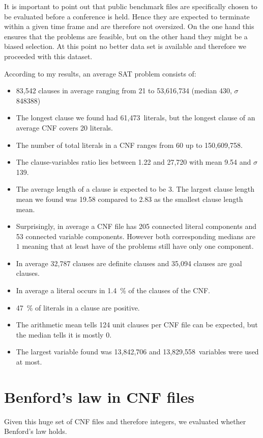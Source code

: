 It is important to point out that public benchmark files are specifically chosen
to be evaluated before a conference is held. Hence they are expected to terminate
within a given time frame and are therefore not oversized. On the one hand this
ensures that the problems are feasible, but on the other hand they might be a
biased selection. At this point no better data set is available and therefore
we proceeded with this dataset.

According to my results, an average SAT problem consists of:
\begin{itemize}
  \item 83,542 clauses in average ranging from 21 to 53,616,734 (median 430, $\sigma$ 848388)
  \item The longest clause we found had 61,473~literals, but the longest clause of an average CNF covers 20 literals.
  \item The number of total literals in a CNF ranges from 60 up to 150,609,758.
  \item The clause-variables ratio lies between 1.22 and 27,720 with mean 9.54 and $\sigma$ 139.
  \item The average length of a clause is expected to be 3. The largest clause length mean we found was 19.58 compared to 2.83 as the smallest clause length mean.
  \item Surprisingly, in average a CNF file has 205 connected literal components and 53 connected variable components. However both corresponding medians are $1$ meaning that at least have of the problems still have only one component.
  \item In average 32,787 clauses are definite clauses and 35,094 clauses are goal clauses.
  \item In average a literal occurs in 1.4~\% of the clauses of the CNF.
  \item 47~\% of literals in a clause are positive.
  \item The arithmetic mean tells 124 unit clauses per CNF file can be expected, but the median tells it is mostly 0.
  \item The largest variable found was 13,842,706 and 13,829,558~variables were used at most.
\end{itemize}

\section{Benford's law in CNF files}
\label{sec:benford}
%
Given this huge set of CNF files and therefore integers, we evaluated whether Benford's law holds.

